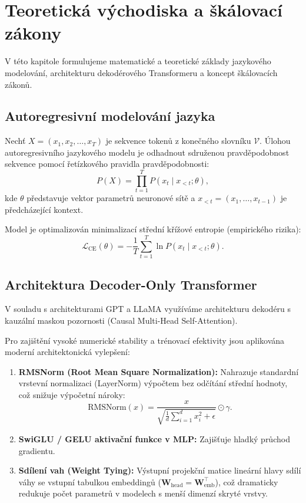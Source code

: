 \chapter{Teoretická východiska a škálovací zákony}
\label{chap:teorie}

V této kapitole formulujeme matematické a teoretické základy jazykového modelování, architekturu dekodérového Transformeru a koncept škálovacích zákonů.

\section{Autoregresivní modelování jazyka}
Nechť $X = (x_1, x_2, \dots, x_T)$ je sekvence tokenů z konečného slovníku $\mathcal{V}$. Úlohou autoregresivního jazykového modelu je odhadnout sdruženou pravděpodobnost sekvence pomocí řetízkového pravidla pravděpodobnosti:
\begin{equation}
    P(X) = \prod_{t=1}^T P(x_t \mid x_{<t}; \theta),
\end{equation}
kde $\theta$ představuje vektor parametrů neuronové sítě a $x_{<t} = (x_1, \dots, x_{t-1})$ je předcházející kontext.

Model je optimalizován minimalizací střední křížové entropie (empirického rizika):
\begin{equation}
    \mathcal{L}_{\text{CE}}(\theta) = -\frac{1}{T} \sum_{t=1}^T \ln P(x_t \mid x_{<t}; \theta).
\end{equation}

\section{Architektura Decoder-Only Transformer}
V souladu s architekturami GPT \cite{radford2019language} a LLaMA \cite{touvron2023llama} využíváme architekturu dekodéru s kauzální maskou pozornosti (Causal Multi-Head Self-Attention). 

Pro zajištění vysoké numerické stability a trénovací efektivity jsou aplikována moderní architektonická vylepšení:
\begin{enumerate}
    \item \textbf{RMSNorm (Root Mean Square Normalization):} Nahrazuje standardní vrstevní normalizaci (LayerNorm) výpočtem bez odčítání střední hodnoty, což snižuje výpočetní nároky:
    \begin{equation}
        \text{RMSNorm}(x) = \frac{x}{\sqrt{\frac{1}{d} \sum_{i=1}^d x_i^2 + \epsilon}} \odot \gamma.
    \end{equation}
    \item \textbf{SwiGLU / GELU aktivační funkce v MLP:} Zajišťuje hladký průchod gradientu.
    \item \textbf{Sdílení vah (Weight Tying):} Výstupní projekční matice lineární hlavy sdílí váhy se vstupní tabulkou embeddingů ($\mathbf{W}_{\text{head}} = \mathbf{W}_{\text{emb}}^\top$), což dramaticky redukuje počet parametrů v modelech s menší dimenzí skryté vrstvy.
\end{enumerate}

